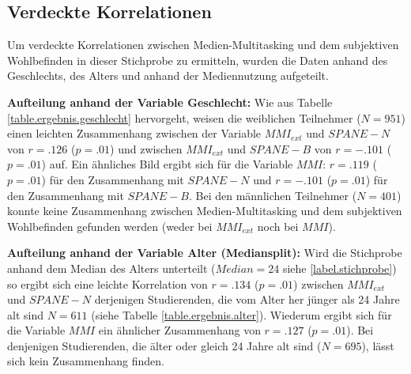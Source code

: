 \subsection{Verdeckte Korrelationen}
Um verdeckte Korrelationen zwischen Medien-Multitasking und dem subjektiven Wohlbefinden in dieser Stichprobe zu ermitteln, wurden die Daten anhand des Geschlechts, des Alters und anhand der Mediennutzung aufgeteilt. 
\par
\textbf{Aufteilung anhand der Variable Geschlecht:} Wie aus Tabelle \ref{table.ergebnis.geschlecht} hervorgeht, weisen die weiblichen Teilnehmer ($N=951$) einen leichten Zusammenhang zwischen der Variable $MMI_{ext}$ und $SPANE-N$ von $r=.126$ ($p=.01$) und zwischen  $MMI_{ext}$ und $SPANE-B$ von $r=-.101$ ($p=.01$) auf. Ein ähnliches Bild ergibt sich für die Variable $MMI$: $r=.119$ ($p=.01$) für den Zusammenhang mit $SPANE-N$ und $r=-.101$ ($p=.01$) für den Zusammenhang mit $SPANE-B$. Bei den männlichen Teilnehmer ($N=401$) konnte keine Zusammenhang zwischen Medien-Multitasking und dem subjektiven Wohlbefinden gefunden werden (weder bei $MMI_{ext}$ noch bei $MMI$).
\par
\textbf{Aufteilung anhand der Variable Alter (Mediansplit):} Wird die Stichprobe anhand dem Median des Alters unterteilt ($Median=24$ siehe \ref{label.stichprobe}) so ergibt sich eine leichte Korrelation von $r=.134$ ($p=.01$) zwischen $MMI_{ext}$ und $SPANE-N$ derjenigen Studierenden, die vom Alter her jünger als 24 Jahre alt sind $N=611$ (siehe Tabelle \ref{table.ergebnis.alter}). Wiederum ergibt sich für die Variable $MMI$ ein ähnlicher Zusammenhang von $r=.127$ ($p=.01$). Bei denjenigen Studierenden, die älter oder gleich 24 Jahre alt sind ($N=695$), lässt sich kein Zusammenhang finden.
\par
